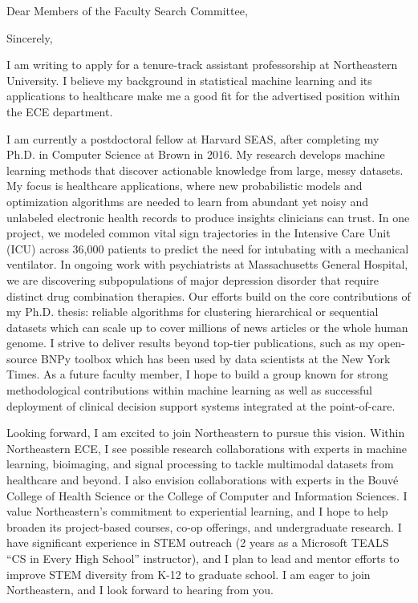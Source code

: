 \documentclass[11pt,letterpaper,roman]{moderncv}        %
\begin{document}
\date{\today}
\opening{Dear Members of the Faculty Search Committee,}
\closing{Sincerely,}

\makelettertitle

I am writing to apply for a tenure-track assistant professorship at Northeastern University. I believe my background in statistical machine learning and its applications to healthcare make me a good fit for the advertised position within the ECE department.

I am currently a postdoctoral fellow at Harvard SEAS, after completing my Ph.D. in Computer Science at Brown in 2016.
My research develops machine learning methods
that discover actionable knowledge from large, messy datasets. 
My focus is healthcare applications, where new probabilistic models and optimization algorithms are needed to learn from abundant yet noisy and unlabeled electronic health records to produce insights clinicians can trust.
In one project, we modeled common vital sign trajectories in the Intensive Care Unit (ICU) across 36,000 patients to predict the need for intubating with a mechanical ventilator. In ongoing work with psychiatrists at Massachusetts General Hospital, we are discovering subpopulations of major depression disorder that require distinct drug combination therapies. Our efforts build on the core contributions of my Ph.D. thesis: reliable algorithms for clustering hierarchical or sequential datasets which can scale up to cover millions of news articles or the whole human genome.
I strive to deliver results beyond top-tier publications, such as my open-source BNPy toolbox which has been used by data scientists at the New York Times. As a future faculty member, I hope to build a group known for strong methodological contributions within machine learning as well as successful deployment of clinical decision support systems integrated at the point-of-care.

Looking forward, I am excited to join Northeastern to pursue this vision.
Within Northeastern ECE, I see possible research collaborations with experts in machine learning, bioimaging, and signal processing to tackle multimodal datasets from healthcare and beyond. 
I also envision collaborations with experts in the Bouvé College of Health Science or the College of Computer and Information Sciences.
I value Northeastern's commitment to experiential learning, and I hope to help broaden its project-based courses, co-op offerings, and undergraduate research.
I have significant experience in STEM outreach (2 years as a Microsoft TEALS ``CS in Every High School'' instructor), and I plan to lead and mentor efforts to improve STEM diversity from K-12 to graduate school.
I am eager to join Northeastern, and I look forward to hearing from you.

\makeletterclosing
\end{document}

